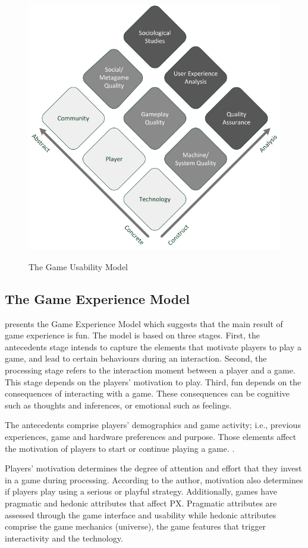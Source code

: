 \begin{figure}[bth]
\myfloatalign
{\includegraphics[width=.6\linewidth]{gfx/model/game_usa_model}} \quad
\caption[The Game Usability Model]{The Game Usability Model \autocite{Nacked}}\label{fig:game_usa_model}
\end{figure}

\subsection{The Game Experience Model}
\textcite{Fernandez2008} presents the Game Experience Model which suggests that the main result of game experience is fun. The model is based on three stages. First, the antecedents stage intends to capture the elements that motivate players to play a game, and lead to certain behaviours during an interaction. Second, the processing stage refers to the interaction moment between a player and a game. This stage depends on the players' motivation to play. Third, fun depends on the consequences of interacting with a game. These consequences can be cognitive such as thoughts and inferences, or emotional such as feelings.

The antecedents comprise players' demographics and game activity; i.e., previous experiences, game and hardware preferences and purpose. Those elements affect the motivation of players to start or continue playing a game. . 

Players' motivation determines the degree of attention and effort that they invest in a game during processing. According to the author, motivation also determines if players play using a serious or playful strategy. Additionally, games have pragmatic and hedonic attributes that affect \ac{PX}. Pragmatic attributes are assessed through the game interface and usability while hedonic attributes comprise the game mechanics (universe), the game features that trigger interactivity and the technology.

